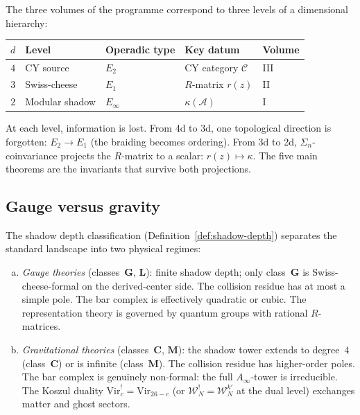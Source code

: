 \documentclass[11pt,reqno]{amsart}
\theoremstyle{definition}
\theoremstyle{remark}
\newcommand{\cA}{\mathcal{A}}
\newcommand{\cW}{\mathcal{W}}
\newcommand{\Vir}{\mathrm{Vir}}
\numberwithin{equation}{section}
\begin{document}
The three volumes of the programme correspond to three levels
of a dimensional hierarchy:

\begin{center}
\renewcommand{\arraystretch}{1.3}
\begin{tabular}{cllll}
\toprule
\textbf{$d$} & \textbf{Level} & \textbf{Operadic type}
 & \textbf{Key datum} & \textbf{Volume} \\
\midrule
$4$ & CY source & $E_2$
 & CY category $\mathcal{C}$ & III \\
$3$ & Swiss-cheese & $E_1$
 & $R$-matrix $r(z)$ & II \\
$2$ & Modular shadow & $E_\infty$
 & $\kappa(\cA)$ & I \\
\bottomrule
\end{tabular}
\end{center}

\noindent
At each level, information is lost. From 4d to 3d, one
topological direction is forgotten: $E_2 \to E_1$ (the
braiding becomes ordering). From 3d to 2d,
$\Sigma_n$-coinvariance projects the $R$-matrix to a scalar:
$r(z) \mapsto \kappa$. The five main theorems are the
invariants that survive both projections.

\subsection{Gauge versus gravity}
\label{ssec:gauge-vs-gravity}

The shadow depth classification
(Definition~\ref{def:shadow-depth}) separates the standard
landscape into two physical regimes:

\begin{enumerate}[(a)]
\item \emph{Gauge theories} (classes~$\mathbf{G}$,
 $\mathbf{L}$): finite shadow depth; only
 class~$\mathbf{G}$ is Swiss-cheese-formal on the
 derived-center side.
 The collision residue has at most a simple pole.
 The bar complex is effectively quadratic or cubic.
 The representation theory is governed by quantum groups with
 rational $R$-matrices.

\item \emph{Gravitational theories} (classes~$\mathbf{C}$,
 $\mathbf{M}$): the shadow tower extends to degree~$4$
 (class~$\mathbf{C}$) or is infinite (class~$\mathbf{M}$).
 The collision residue has higher-order poles. The bar complex
 is genuinely non-formal: the full $A_\infty$-tower is
 irreducible. The Koszul duality
 $\Vir_c^! = \Vir_{26-c}$ (or
 $\cW_N^! = \cW_N^{k'}$ at the dual level)
 exchanges matter and ghost sectors.
\end{enumerate}
\end{document}
